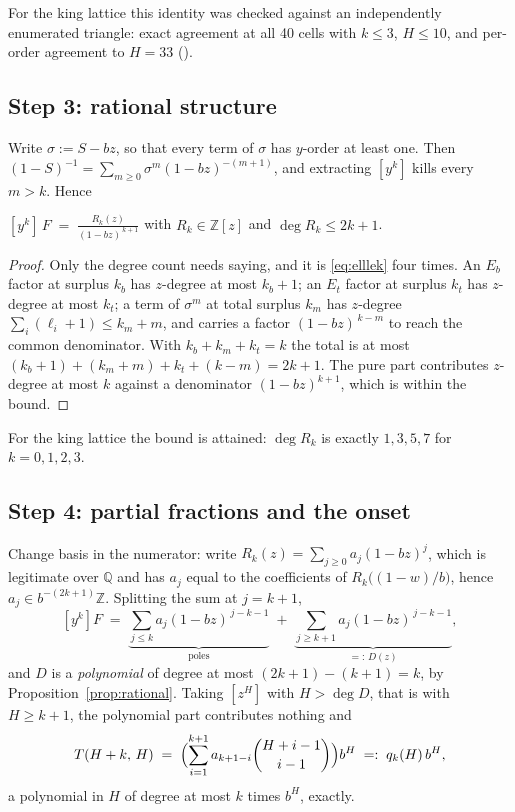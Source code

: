 \documentclass[11pt]{article}
\newcommand{\Z}{\mathbb{Z}}
\newcommand{\Q}{\mathbb{Q}}
\begin{document}
For the king lattice this identity was checked against an independently
enumerated triangle: exact agreement at all 40 cells with $k \le 3$, $H \le 10$,
and per-order agreement to $H = 33$
().

\subsection*{Step 3: rational structure}

Write $\sigma := S - bz$, so that every term of $\sigma$ has $y$-order at least
one. Then $(1-S)^{-1} = \sum_{m \ge 0} \sigma^m (1-bz)^{-(m+1)}$, and extracting
$[y^k]$ kills every $m > k$. Hence

\begin{proposition}
\label{prop:rational}
$\displaystyle [y^k]\,F \;=\; \frac{R_k(z)}{(1-bz)^{\,k+1}}$
with $R_k \in \Z[z]$ and $\deg R_k \le 2k+1$.
\end{proposition}

\begin{proof}
Only the degree count needs saying, and it is \eqref{eq:elllek} four times. An
$E_b$ factor at surplus $k_b$ has $z$-degree at most $k_b + 1$; an $E_t$ factor at
surplus $k_t$ has $z$-degree at most $k_t$; a term of $\sigma^m$ at total surplus
$k_m$ has $z$-degree $\sum_i (\ell_i + 1) \le k_m + m$, and carries a factor
$(1-bz)^{\,k-m}$ to reach the common denominator. With
$k_b + k_m + k_t = k$ the total is at most
$(k_b+1) + (k_m+m) + k_t + (k-m) = 2k+1$. The pure part contributes $z$-degree at
most $k$ against a denominator $(1-bz)^{k+1}$, which is within the bound.
\end{proof}

For the king lattice the bound is attained: $\deg R_k$ is exactly $1,3,5,7$ for
$k = 0,1,2,3$.

\subsection*{Step 4: partial fractions and the onset}

Change basis in the numerator: write
$R_k(z) = \sum_{j \ge 0} a_j (1-bz)^{j}$, which is legitimate over $\Q$ and has
$a_j$ equal to the coefficients of $R_k\bigl((1-w)/b\bigr)$, hence
$a_j \in b^{-(2k+1)}\Z$. Splitting the sum at $j = k+1$,
\[
  [y^k]F \;=\; \underbrace{\sum_{j \le k} a_j (1-bz)^{\,j-k-1}}_{\text{poles}}
             \;+\; \underbrace{\sum_{j \ge k+1} a_j (1-bz)^{\,j-k-1}}_{=:\,D(z)} ,
\]
and $D$ is a \emph{polynomial} of degree at most $(2k+1)-(k+1) = k$, by
Proposition~\ref{prop:rational}. Taking $[z^H]$ with $H > \deg D$, that is with
$H \ge k+1$, the polynomial part contributes nothing and
\begin{equation}
  T(H+k,\,H) \;=\; \Bigl(\sum_{i=1}^{k+1} a_{k+1-i}\binom{H+i-1}{\,i-1\,}\Bigr) b^{H}
  \;=:\; q_k(H)\, b^{H},
  \label{eq:qk}
\end{equation}
a polynomial in $H$ of degree at most $k$ times $b^H$, exactly.
\end{document}

